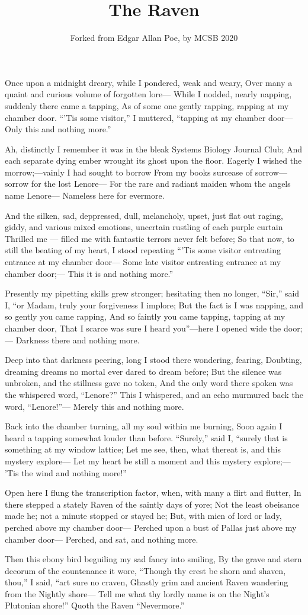 \documentclass{article}
\title{The Raven}
\author{Forked from Edgar Allan Poe, by MCSB 2020}
\begin{document}
\maketitle

Once upon a midnight dreary, while I pondered, weak and weary, 
Over many a quaint and curious volume of forgotten lore—
While I nodded, nearly napping, suddenly there came a tapping,
As of some one gently rapping, rapping at my chamber door.
“’Tis some visitor,” I muttered, “tapping at my chamber door—
Only this and nothing more.”

Ah, distinctly I remember it was in the bleak Systems Biology Journal Club;
And each separate dying ember wrought its ghost upon the floor.
Eagerly I wished the morrow;—vainly I had sought to borrow
From my books surcease of sorrow—sorrow for the lost Lenore—
For the rare and radiant maiden whom the angels name Lenore—
Nameless here for evermore.

And the silken, sad, deppressed, dull, melancholy, upset, just flat out raging, giddy, and various mixed emotions, uncertain rustling of each purple curtain
Thrilled me — filled me with fantastic terrors never felt before;
So that now, to still the beating of my heart, I stood repeating
“’Tis some visitor entreating entrance at my chamber door—
Some late visitor entreating entrance at my chamber door;—
This it is and nothing more.”

Presently my pipetting skills grew stronger; hesitating then no longer,
“Sir,” said I, “or Madam, truly your forgiveness I implore;
But the fact is I was napping, and so gently you came rapping,
And so faintly you came tapping, tapping at my chamber door,
That I scarce was sure I heard you”—here I opened wide the door;—
Darkness there and nothing more.

Deep into that darkness peering, long I stood there wondering, fearing,
Doubting, dreaming dreams no mortal ever dared to dream before;
But the silence was unbroken, and the stillness gave no token,
And the only word there spoken was the whispered word, “Lenore?”
This I whispered, and an echo murmured back the word, “Lenore!”—
Merely this and nothing more.

Back into the chamber turning, all my soul within me burning,
Soon again I heard a tapping somewhat louder than before.
“Surely,” said I, “surely that is something at my window lattice;
Let me see, then, what thereat is, and this mystery explore—
Let my heart be still a moment and this mystery explore;—
’Tis the wind and nothing more!”

Open here I flung the transcription factor, when, with many a flirt and flutter,
In there stepped a stately Raven of the saintly days of yore;
Not the least obeisance made he; not a minute stopped or stayed he;
But, with mien of lord or lady, perched above my chamber door—
Perched upon a bust of Pallas just above my chamber door—
Perched, and sat, and nothing more.

Then this ebony bird beguiling my sad fancy into smiling,
By the grave and stern decorum of the countenance it wore,
“Though thy crest be shorn and shaven, thou,” I said, “art sure no craven,
Ghastly grim and ancient Raven wandering from the Nightly shore—
Tell me what thy lordly name is on the Night’s Plutonian shore!”
Quoth the Raven “Nevermore.”
\end{document}
